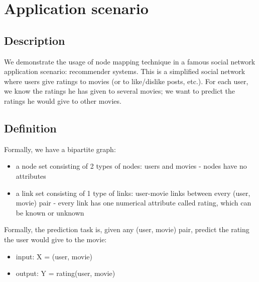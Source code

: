 \documentclass[twocolumn]{article}
\begin{document}
\section{Application scenario}

\subsection{Description}
We demonstrate the usage of node mapping technique in a famous social network 
application scenario: recommender systems.
This is a simplified social network where users give ratings to movies (or to 
like/dislike posts, etc.).
For each user, we know the ratings he has given to several movies; we want to 
predict the ratings he would give to other movies.

\subsection{Definition}
Formally, we have a bipartite graph:
\begin{itemize}
	\item a node set consisting of 2 types of nodes: users and movies - nodes 
	have no attributes
	\item a link set consisting of 1 type of links: user-movie links between 
	every (user, movie) pair - every link has one numerical attribute called 
	rating, which can be known or unknown
\end{itemize}
Formally, the prediction task is, given any (user, movie) pair, predict the 
rating the user would give to the movie:
\begin{itemize}
	\item input: X = (user, movie)
	\item output: Y = rating(user, movie)
\end{itemize}
\end{document}
